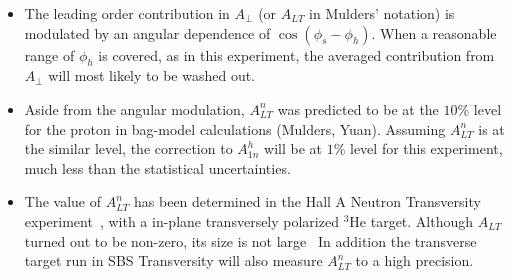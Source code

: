 \begin{itemize}
    \item  The leading order contribution in $A_{\perp}$ (or $A_{LT}$ in Mulders' notation)  
           is modulated by an angular dependence of $ \cos(\phi_s - \phi_h)$.
           When a reasonable range of $\phi_h$ is covered,  as in this experiment, 
           the averaged contribution from $A_{\perp}$ will most likely to be washed out.
 
    \item  Aside from the angular modulation, $A^n_{LT}$  was predicted to be at 
           the $10 \%$ level for the proton in bag-model calculations (Mulders, Yuan).
           Assuming $A^n_{LT}$ is at the similar level, the correction to $A_{1n}^h$
           will be at $1 \%$ level for this experiment, much less than the 
           statistical uncertainties.    
             
    \item  The value of $A^n_{LT}$ has been determined in the Hall A Neutron
           Transversity experiment~\cite{E06010_ALT_PRL}, with a in-plane transversely polarized $^3$He target.
             Although $A_{LT}$ turned out to be non-zero,  its size is not large~\cite{E06010_ALT_PRL}
            In addition the transverse target run in SBS Transversity will also measure $A^n_{LT}$ to a high precision.
\end{itemize}  



